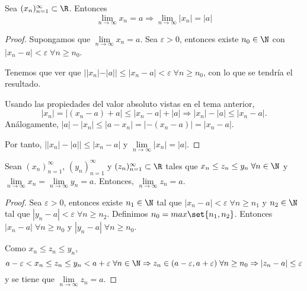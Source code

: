 \vspace{1cm}
\begin{proposition}
	Sea \((x_n)^{\infty}_{n = 1} \subset \R\). Entonces
	\[
		\lim\limits_{n \to \infty} x_n = a \Rightarrow \lim\limits_{n \to \infty} |x_n| = |a|
	\]
\end{proposition}
\begin{proof}
	Supongamos que \(\lim\limits_{n \to \infty} x_n = a \). Sea \(\varepsilon > 0 \), entonces existe \(n_0 \in \N \) con \(|x_n - a| < \varepsilon \; \forall n \geq n_0\).

	Tenemos que ver que \(| |x_n| - |a| | \leq \left\vert x_n - a  \right\vert < \varepsilon \; \forall n \geq n_0 \), con lo que se tendría el resultado.

	Usando las propiedades del valor absoluto vistas en el tema anterior,
	\[|x_n| = \left\vert (x_n-a) + a \right\vert \leq \left\vert x_n-a  \right\vert  + \left\vert a  \right\vert \Rightarrow \left\vert x_n  \right\vert - \left\vert a  \right\vert \leq \left\vert x_n-a  \right\vert.
	\]
	Análogamente, \(\left\vert a  \right\vert - \left\vert x_n  \right\vert \leq \left\vert a - x_n \right\vert = \left\vert -(x_n-a) \right\vert = \left\vert x_n-a  \right\vert \).

	Por tanto, \(\left\vert \left\vert x_n  \right\vert - \left\vert a  \right\vert  \right\vert \leq \left\vert x_n - a  \right\vert\) y \(\lim\limits_{n \to \infty} \left\vert x_n  \right\vert = \left\vert a  \right\vert \).
\end{proof}

\begin{proposition}
	Sean \((x_n)^{\infty}_{n = 1} \), \((y_n)^{\infty}_{n = 1} \) y \((z_n)^{\infty}_{n=1} \subset \R\) tales que \(x_n \leq z_n \leq y_n \; \forall n \in \N \) y \(\lim\limits_{n \to \infty} x_n = \lim\limits_{n \to \infty} y_n = a \). Entonces, \(\lim\limits_{n \to \infty} z_n = a \).
\end{proposition}
\begin{proof}
	Sea \(\varepsilon > 0 \), entonces existe \(n_1 \in \N \) tal que \(\left\vert x_n - a  \right\vert < \varepsilon \; \forall n \geq n_1 \) y \(n_2 \in \N \) tal que \(\left\vert y_n - a  \right\vert < \varepsilon \; \forall n \geq n_2 \). Definimos \(n_0 = max\set{n_1,n_2 }\). Entonces \(\left\vert x_n - a  \right\vert \; \forall n \geq n_0 \)  y \(\left\vert y_n - a  \right\vert \; \forall n \geq n_0 \).

	Como \(x_n \leq z_n \leq y_n \), \[
		a - \varepsilon < x_n \leq z_n \leq y_n < a + \varepsilon \; \forall n \in \N \Rightarrow z_n \in (a-\varepsilon,a+\varepsilon) \; \forall n \geq n_0 \Rightarrow |z_n - a| \leq \varepsilon
	\] y se tiene que \(\lim\limits_{n \to \infty} z_n = a\).
\end{proof}

